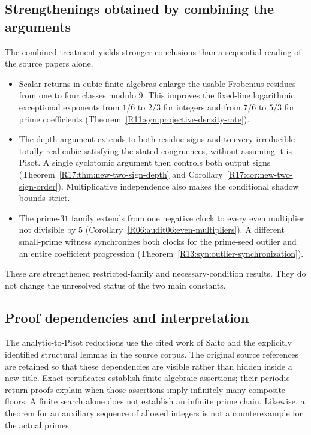 \documentclass[11pt,a4paper]{article}
\theoremstyle{definition}\newtheorem{definition}[theorem]{Definition}
\theoremstyle{remark}\newtheorem{remark}[theorem]{Remark}
\begin{document}
\subsection{Strengthenings obtained by combining the arguments}
The combined treatment yields stronger conclusions than a sequential
reading of the source papers alone.
\begin{itemize}
\item Scalar returns in cubic finite algebras enlarge the usable
Frobenius residues from one to four classes modulo $9$. This improves
the fixed-line logarithmic exceptional exponents from $1/6$ to $2/3$
for integers and from $7/6$ to $5/3$ for prime coefficients
(Theorem~\ref{R11:syn:projective-density-rate}).
\item The depth argument extends to both residue signs and to every
irreducible totally real cubic satisfying the stated congruences,
without assuming it is Pisot. A single cyclotomic argument then
controls both output signs
(Theorem~\ref{R17:thm:new-two-sign-depth} and
Corollary~\ref{R17:cor:new-two-sign-order}). Multiplicative independence
also makes the conditional shadow bounds strict.
\item The prime-$31$ family extends from one negative clock to every
even multiplier not divisible by $5$
(Corollary~\ref{R06:audit06:even-multipliers}). A different small-prime
witness synchronizes both clocks for the prime-seed outlier and an
entire coefficient progression
(Theorem~\ref{R13:syn:outlier-synchronization}).
\end{itemize}
These are strengthened restricted-family and necessary-condition results.
They do not change the unresolved status of the two main constants.

\subsection{Proof dependencies and interpretation}
The analytic-to-Pisot reductions use the cited work of Saito and the
explicitly identified structural lemmas in the source corpus. The
original source references are retained so that these dependencies are
visible rather than hidden inside a new title. Exact certificates establish
finite algebraic assertions; their periodic-return proofs explain when
those assertions imply infinitely many composite floors. A finite search
alone does not establish an infinite prime chain. Likewise, a theorem for
an auxiliary sequence of allowed integers is not a counterexample for the
actual primes.
\end{document}
